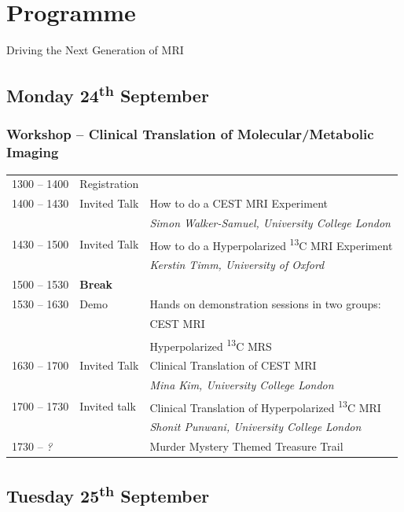 \documentclass[a5paper,10pt,twoside,onecolumn,openany,helvetica,showtrims]{memoir}
\newlength{\LittleSkip}
\newcommand{\talkauthor}[1]{\small\emph{#1}}
\begin{document}
\chapter{Programme}
\begin{center}

\textbf \emph \Huge Driving the Next Generation of MRI	
\end{center}
\vspace{5em}
\section{Monday 24\textsuperscript{th} September}
\subsection*{Workshop -- Clinical Translation of Molecular/Metabolic Imaging}
\begin{tabular}{lll}
	1300 -- 1400 & Registration&\\
	1400 -- 1430 & Invited Talk & How to do a CEST MRI Experiment \\ 
	&   & \talkauthor{Simon Walker-Samuel, University College London} \\ 
	1430 -- 1500 & Invited Talk & How to do a Hyperpolarized \textsuperscript{13}C MRI Experiment \\ 
	&	&	\talkauthor{Kerstin Timm, University of Oxford}\\
	1500 -- 1530 & \textbf{Break} & \\[\LittleSkip]
	1530 -- 1630 & Demo & Hands on demonstration sessions in two groups:  \\
				 & &  \textbullet CEST MRI \\ 
				 & & \textbullet Hyperpolarized \textsuperscript{13}C MRS \\[\LittleSkip]
	1630 -- 1700 & Invited Talk & Clinical Translation of CEST MRI\\
	& & \talkauthor{Mina Kim, University College London} \\[\LittleSkip]
	1700 -- 1730 & Invited talk & Clinical Translation of Hyperpolarized \textsuperscript{13}C MRI \\ 
	& 	& \talkauthor{Shonit Punwani, University College London} \\[\LittleSkip]
	1730 -- \emph{?} & & Murder Mystery Themed Treasure Trail 
\end{tabular}
\clearpage

\section{Tuesday 25\textsuperscript{th} September}
\end{document}
